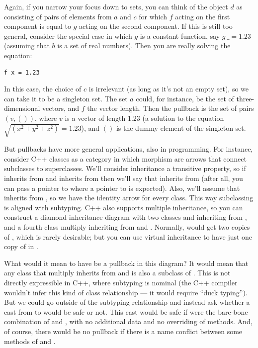 \noindent
Again, if you narrow your focus down to sets, you can think of the
object $d$ as consisting of pairs of elements from $a$ and
$c$ for which $f$ acting on the first component is equal
to $g$ acting on the second component. If this is still too
general, consider the special case in which $g$ is a constant
function, say $g~\_ = 1.23$ (assuming that $b$ is a set
of real numbers). Then you are really solving the equation:

\begin{Verbatim}
f x = 1.23
\end{Verbatim}

In this case, the choice of $c$ is irrelevant (as long as it's
not an empty set), so we can take it to be a singleton set. The set
$a$ could, for instance, be the set of three-dimensional vectors,
and $f$ the vector length. Then the pullback is the set of pairs
$(v, ())$, where $v$ is a vector of length 1.23 (a
solution to the equation $\sqrt{(x^{2}+y^{2}+z^{2})} = 1.23$), and
$()$ is the dummy element of the singleton set.

But pullbacks have more general applications, also in programming. For
instance, consider C++ classes as a category in which morphism are
arrows that connect subclasses to superclasses. We'll consider
inheritance a transitive property, so if  inherits from  and 
inherits from  then we'll say that  inherits from  (after all, you
can pass a pointer to  where a pointer to  is expected). Also, we'll
assume that  inherits from , so we have the identity arrow for every
class. This way subclassing is aligned with subtyping. C++ also supports
multiple inheritance, so you can construct a diamond inheritance diagram
with two classes  and  inheriting from , and a fourth class 
multiply inheriting from  and . Normally,  would get two copies of ,
which is rarely desirable; but you can use virtual inheritance to have
just one copy of  in .

What would it mean to have  be a pullback in this diagram? It would
mean that any class  that multiply inherits from  and  is also a
subclass of . This is not directly expressible in C++, where subtyping
is nominal (the C++ compiler wouldn't infer this kind of class
relationship --- it would require ``duck typing''). But we could go
outside of the subtyping relationship and instead ask whether a cast
from  to  would be safe or not. This cast would be safe if  were the
bare-bone combination of  and , with no additional data and no
overriding of methods. And, of course, there would be no pullback if
there is a name conflict between some methods of  and .

